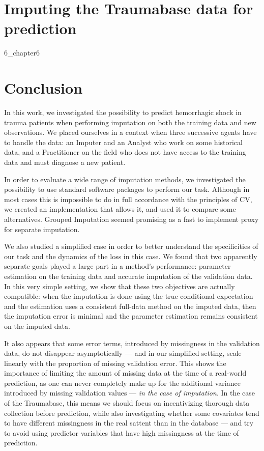 \documentclass[12pt, a4paper]{memoir}
\begin{document}
\chapter{Imputing the Traumabase data for prediction}
\label{analysis}
{6_chapter6}

\chapter*{Conclusion}
In this work, we investigated the possibility to predict hemorrhagic shock in trauma patients when performing imputation on both the training data and new observations. We placed ourselves in a context when three successive agents have to handle the data: an Imputer and an Analyst who work on some historical data, and a Practitioner on the field who does not have access to the training data and must diagnose a new patient.

In order to evaluate a wide range of imputation methods, we investigated the possibility to use standard software packages to perform our task. Although in most cases this is impossible to do in full accordance with the principles of CV, we created an implementation that allows it, and used it to compare some alternatives. Grouped Imputation seemed promising as a fast to implement proxy for separate imputation.

We also studied a simplified case in order to better understand the specificities of our task and the dynamics of the loss in this case. We found that two apparently separate goals played a large part in a method's performance: parameter estimation on the training data and accurate imputation of the validation data. In this very simple setting, we show that these two objectives are actually compatible: when the imputation is done using the true conditional expectation and the estimation uses a consistent full-data method on the imputed data, then the imputation error is minimal and the parameter estimation remains consistent on the imputed data. 

It also appears that some error terms, introduced by missingness in the validation data, do not disappear asymptotically --- and in our simplified setting, scale linearly with the proportion of missing validation error. This shows the importance of limiting the amount of missing data at the time of a real-world prediction, as one can never completely make up for the additional variance introduced by missing validation values --- \emph{in the case of imputation}. In the case of the Traumabase, this means we should focus on incentivizing thorough data collection before prediction, while also investigating whether some covariates tend to have different missingness in the real sattent than in the database --- and try to avoid using predictor variables that have high missingness at the time of prediction.
\end{document}

